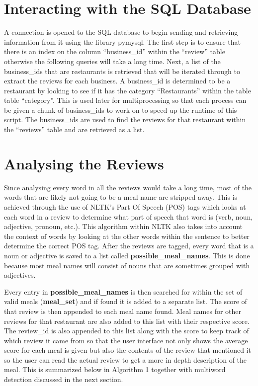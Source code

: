 \documentclass[12pt, openany]{scrbook}
\begin{document}
\section{Interacting with the SQL Database}
A connection is opened to the SQL database to begin sending
and retrieving information from it using the library pymysql.
The first step is to ensure that there is an index on the column
``business\_id'' within the ``review'' table otherwise the following
queries will take a long time.
Next, a list of the business\_ids that are restaurants is retrieved
that will be iterated through to extract the reviews for each business.
A business\_id is determined to be a restaurant by looking to see if it
has the category ``Restaurants'' within the table table ``category''.
This is used later for multiprocessing so that each process can be given
a chunk of business\_ids to work on to speed up the runtime of this script.
The business\_ids are used to find the reviews for that restaurant within 
the ``reviews'' table and are retrieved as a list.

\section{Analysing the Reviews}
Since analysing every word in all the reviews would take a long
time, most of the words that are likely not going to be a meal name
are stripped away.
This is achieved through the use of NLTK's Part Of Speech (POS)
tags which looks at each word in a review to determine what part of
speech that word is (verb, noun, adjective, pronoun, etc.).
This algorithm within NLTK also takes into account the context of words by looking at the
other words within the sentence to better determine the correct POS tag.
After the reviews are tagged, every word that is a noun or adjective
is saved to a list called \textbf{possible\_meal\_names}.
This is done because most meal names will consist of nouns that are sometimes
grouped with adjectives.

Every entry in \textbf{possible\_meal\_names} is then searched for within
the set of valid meals (\textbf{meal\_set}) and if found it is added to a separate list.
The score of that review is then appended to each meal name found.
Meal names for other reviews for that restaurant are also added to this
list with their respective score.
The review\_id is also appended to this list along with the score to keep
track of which review it came from so that the user interface not
only shows the average score for each meal is given but also the contents of the
review that mentioned it so the user can read the actual review to get
a more in depth description of the meal.
This is summarized below in Algorithm 1 together with multiword detection
discussed in the next section.
\end{document}
